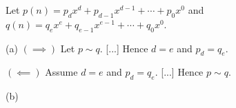 
Let
$p(n) = p_dx^d + p_{d-1}x^{d-1} + \cdots + p_0x^0$
and
$q(n) = q_ex^e + q_{e-1}x^{e-1} + \cdots + q_0x^0$.

(a)
$(\implies)$
Let $p \sim q$.
[...]
Hence $d = e$ and $p_d = q_e$.

$(\impliedby)$
Assume $d = e$ and $p_d = q_e$.
[...]
Hence $p \sim q$.

(b)
